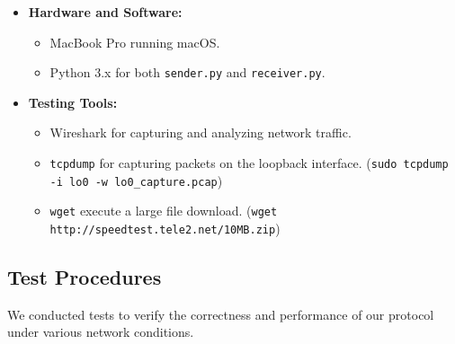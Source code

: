 \documentclass[11pt]{article}
\begin{document}
\begin{itemize}
    \item \textbf{Hardware and Software:}
    \begin{itemize}
        \item MacBook Pro running macOS.
        \item Python 3.x for both \texttt{sender.py} and \texttt{receiver.py}.
    \end{itemize}
    \item \textbf{Testing Tools:}
    \begin{itemize}
        \item Wireshark for capturing and analyzing network traffic.
        \item \texttt{tcpdump} for capturing packets on the loopback interface. (\texttt{sudo tcpdump -i lo0 -w lo0\_capture.pcap})
        \item \texttt{wget} execute a large file download.
        (\texttt{wget http://speedtest.tele2.net/10MB.zip})
    \end{itemize}
\end{itemize}

\subsection{Test Procedures}

We conducted tests to verify the correctness and performance of our protocol under various network conditions.
\end{document}
